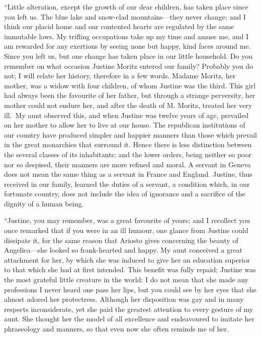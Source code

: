 \documentclass[12pt,openright]{book}
\begin{document}
“Little alteration, except the growth of our dear children, has taken place since you left us. The blue lake and snow-clad mountains—they never change; and I think our placid home and our contented hearts are regulated by the same immutable laws. My trifling occupations take up my time and amuse me, and I am rewarded for any exertions by seeing none but happy, kind faces around me. Since you left us, but one change has taken place in our little household. Do you remember on what occasion Justine Moritz entered our family? Probably you do not; I will relate her history, therefore in a few words. Madame Moritz, her mother, was a widow with four children, of whom Justine was the third. This girl had always been the favourite of her father, but through a strange perversity, her mother could not endure her, and after the death of M. Moritz, treated her very ill. My aunt observed this, and when Justine was twelve years of age, prevailed on her mother to allow her to live at our house. The republican institutions of our country have produced simpler and happier manners than those which prevail in the great monarchies that surround it. Hence there is less distinction between the several classes of its inhabitants; and the lower orders, being neither so poor nor so despised, their manners are more refined and moral. A servant in Geneva does not mean the same thing as a servant in France and England. Justine, thus received in our family, learned the duties of a servant, a condition which, in our fortunate country, does not include the idea of ignorance and a sacrifice of the dignity of a human being.

“Justine, you may remember, was a great favourite of yours; and I recollect you once remarked that if you were in an ill humour, one glance from Justine could dissipate it, for the same reason that Ariosto gives concerning the beauty of Angelica—she looked so frank-hearted and happy. My aunt conceived a great attachment for her, by which she was induced to give her an education superior to that which she had at first intended. This benefit was fully repaid; Justine was the most grateful little creature in the world: I do not mean that she made any professions I never heard one pass her lips, but you could see by her eyes that she almost adored her protectress. Although her disposition was gay and in many respects inconsiderate, yet she paid the greatest attention to every gesture of my aunt. She thought her the model of all excellence and endeavoured to imitate her phraseology and manners, so that even now she often reminds me of her.
\end{document}
